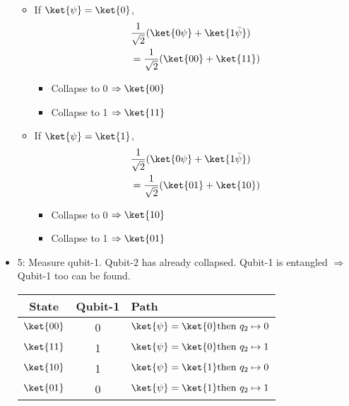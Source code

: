\documentclass[12pt]{exam}
\begin{document}
\begin{questions}
\begin{solution}
\begin{itemize}
  \begin{itemize}
  \item If $\ket{\psi} = \ket{0}$,
    \begin{align*}
 & \frac{1}{\sqrt{2}}(\ket{0\psi} + \ket{1\bar{\psi}}) \\
 &= \frac{1}{\sqrt{2}}(\ket{00} + \ket{11}) \\
    \end{align*}
    \begin{itemize}
    \item Collapse to 0 $\Rightarrow \ket{00}$ 
    \item Collapse to 1 $\Rightarrow \ket{11}$ 
    \end{itemize}
  \item If $\ket{\psi} = \ket{1}$,
    \begin{align*}
 & \frac{1}{\sqrt{2}}(\ket{0\psi} + \ket{1\bar{\psi}}) \\
 &= \frac{1}{\sqrt{2}}(\ket{01} + \ket{10}) \\
    \end{align*}
    \begin{itemize}
    \item Collapse to 0 $\Rightarrow \ket{10}$ 
    \item Collapse to 1 $\Rightarrow \ket{01}$ 
    \end{itemize}
  \end{itemize}
  
\item 5:
  Measure qubit-1. Qubit-2 has already collapsed.
  Qubit-1 is entangled $\Rightarrow$ Qubit-1 too can be found.
  
  \begin{center}
    \begin{tabular}{ccl}
      \toprule
      State & Qubit-1 & Path \\
      \midrule
      $\ket{00}$ & 0 & $\ket{\psi} = \ket{0} \text{then } q_2 \mapsto 0$ \\
      $\ket{11}$ & 1 & $\ket{\psi} = \ket{0} \text{then } q_2 \mapsto 1$ \\
      $\ket{10}$ & 1 & $\ket{\psi} = \ket{1} \text{then } q_2 \mapsto 0$ \\
      $\ket{01}$ & 0 & $\ket{\psi} = \ket{1} \text{then } q_2 \mapsto 1$ \\
      \bottomrule
    \end{tabular}
  \end{center}


\end{itemize}
\end{solution}
\end{questions}
\end{document}
